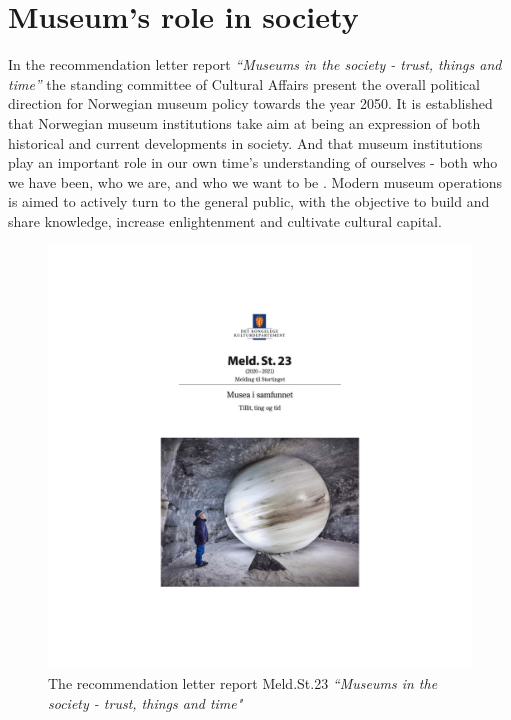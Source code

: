 \section{Museum's role in society}
In the recommendation letter report \emph{“Museums in the society - trust, things and time”} the standing committee of Cultural Affairs present the overall political direction for Norwegian museum policy towards the year 2050. It is established that Norwegian museum institutions take aim at being an expression of both historical and current developments in society. And that museum institutions play an important role in our own time’s understanding of ourselves - both who we have been, who we are, and who we want to be \autocite[p. 7]{melding23}. Modern museum operations is aimed to actively turn to the general public, with the objective to build and share knowledge, increase enlightenment and cultivate cultural capital.

\begin{figure}[H]
\includegraphics[width=12cm]{pictures/stortingsmelding.jpg}
\caption{The recommendation letter report Meld.St.23 \emph{“Museums in the society - trust, things and time"}}
\centering 
\end{figure}

